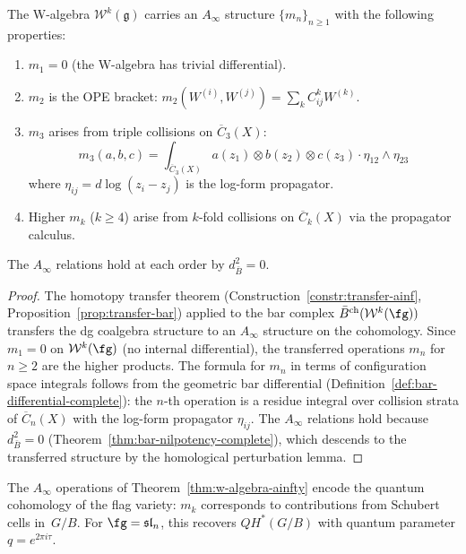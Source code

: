 \begin{theorem}
\label{thm:w-algebra-ainfty}
The W-algebra $\mathcal{W}^k(\mathfrak{g})$ carries an $A_\infty$
structure $\{m_n\}_{n \geq 1}$ with the following properties:
\begin{enumerate}[label=\textup{(\roman*)}]
\item $m_1 = 0$ \textup{(}the W-algebra has trivial
  differential\textup{)}.
\item $m_2$ is the OPE bracket:
  $m_2(W^{(i)}, W^{(j)}) = \sum_k C^k_{ij} W^{(k)}$.
\item $m_3$ arises from triple collisions on
  $\overline{C}_3(X)$:
  \[
  m_3(a,b,c) = \int_{\overline{C}_3(X)}
  a(z_1) \otimes b(z_2) \otimes c(z_3)
  \cdot \eta_{12} \wedge \eta_{23}
  \]
  where $\eta_{ij} = d\log(z_i - z_j)$ is the
  log-form propagator.
\item Higher $m_k$ \textup{(}$k \geq 4$\textup{)} arise
  from $k$-fold collisions on $\overline{C}_k(X)$
  via the propagator calculus.
\end{enumerate}
The $A_\infty$ relations hold at each order by
$d_{\bar{B}}^2 = 0$.
\end{theorem}

\begin{proof}
The homotopy transfer theorem
(Construction~\ref{constr:transfer-ainf},
Proposition~\ref{prop:transfer-bar}) applied to the bar
complex $\bar{B}^{\mathrm{ch}}(\mathcal{W}^k(\fg))$
transfers the dg coalgebra structure to an $A_\infty$
structure on the cohomology.  Since $m_1 = 0$ on
$\mathcal{W}^k(\fg)$ (no internal differential), the
transferred operations $m_n$ for $n \geq 2$ are the
higher products.  The formula for $m_n$ in terms of
configuration space integrals follows from the geometric
bar differential
(Definition~\ref{def:bar-differential-complete}): the
$n$-th operation is a residue integral over collision
strata of $\overline{C}_n(X)$ with the log-form
propagator $\eta_{ij}$.  The $A_\infty$ relations hold
because $d_{\bar{B}}^2 = 0$
(Theorem~\ref{thm:bar-nilpotency-complete}), which
descends to the transferred structure by the homological
perturbation lemma.
\end{proof}

\begin{conjecture}
\label{conj:w-algebra-quantum-cohomology}
The $A_\infty$ operations of
Theorem~\ref{thm:w-algebra-ainfty} encode the quantum
cohomology of the flag variety: $m_k$ corresponds to
contributions from Schubert cells in~$G/B$.  For
$\fg = \mathfrak{sl}_n$, this recovers $QH^*(G/B)$
with quantum parameter $q = e^{2\pi i \tau}$.
\end{conjecture}

